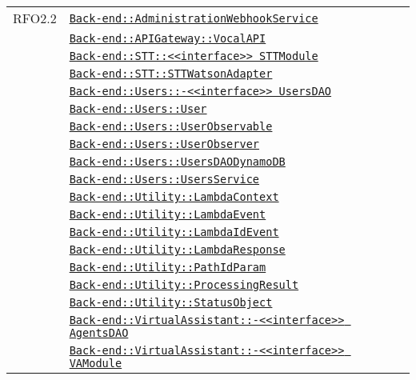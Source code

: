\begin{longtable}{|>{\centering}m{3cm}|m{10cm}<{\centering}|}
RFO2.2 & \hyperref[Back-end::AdministrationWebhookService]{\texttt{Back-end::AdministrationWebhookService}}\\
& \hyperref[Back-end::APIGateway::VocalAPI]{\texttt{Back-end::APIGateway::VocalAPI}}\\
& \hyperref[Back-end::STT::<<interface>> STTModule]{\texttt{Back-end::STT::<<interface>> STTModule}}\\
& \hyperref[Back-end::STT::STTWatsonAdapter]{\texttt{Back-end::STT::STTWatsonAdapter}}\\
& \hyperref[Back-end::Users::<<interface>> UsersDAO]{\texttt{Back-end::Users::-\linebreak <<interface>> UsersDAO}}\\
& \hyperref[Back-end::Users::User]{\texttt{Back-end::Users::User}}\\
& \hyperref[Back-end::Users::UserObservable]{\texttt{Back-end::Users::UserObservable}}\\
& \hyperref[Back-end::Users::UserObserver]{\texttt{Back-end::Users::UserObserver}}\\
& \hyperref[Back-end::Users::UsersDAODynamoDB]{\texttt{Back-end::Users::UsersDAODynamoDB}}\\
& \hyperref[Back-end::Users::UsersService]{\texttt{Back-end::Users::UsersService}}\\
& \hyperref[Back-end::Utility::LambdaContext]{\texttt{Back-end::Utility::LambdaContext}}\\
& \hyperref[Back-end::Utility::LambdaEvent]{\texttt{Back-end::Utility::LambdaEvent}}\\
& \hyperref[Back-end::Utility::LambdaIdEvent]{\texttt{Back-end::Utility::LambdaIdEvent}}\\
& \hyperref[Back-end::Utility::LambdaResponse]{\texttt{Back-end::Utility::LambdaResponse}}\\
& \hyperref[Back-end::Utility::PathIdParam]{\texttt{Back-end::Utility::PathIdParam}}\\
& \hyperref[Back-end::Utility::ProcessingResult]{\texttt{Back-end::Utility::ProcessingResult}}\\
& \hyperref[Back-end::Utility::StatusObject]{\texttt{Back-end::Utility::StatusObject}}\\
& \hyperref[Back-end::VirtualAssistant::<<interface>> AgentsDAO]{\texttt{Back-end::VirtualAssistant::-\linebreak <<interface>> AgentsDAO}}\\
& \hyperref[Back-end::VirtualAssistant::<<interface>> VAModule]{\texttt{Back-end::VirtualAssistant::-\linebreak <<interface>> VAModule}}\\

\end{longtable}
